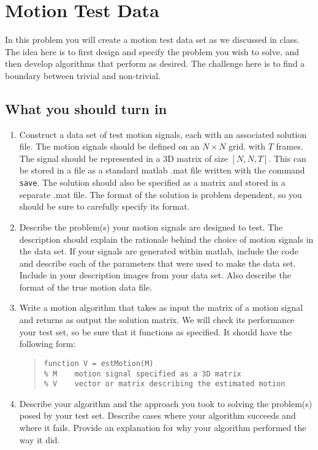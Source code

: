 \documentclass[11pt]{article}
\begin{document}
\pagebreak
\section{Motion Test Data}

In this problem you will create a motion test data set as we discussed in class.  The idea here is to first design and specify the problem you wish to solve, and then develop algorithms that perform as desired.  The challenge here is to find a boundary between trivial and non-trivial.

\subsection*{What you should turn in}

\begin{enumerate}

\item Construct a data set of test motion signals, each with an associated solution file.  The motion signals should be defined on an $N \times N$ grid. with $T$ frames.  The signal should be represented in a 3D matrix of size $[N, N, T]$.  This can be stored in a file as a standard matlab .mat file written with the command \texttt{save}.   The solution should also be specified as a matrix and stored in a separate .mat file.  The format of the solution is problem dependent, so you should be sure to carefully specify its format.

\item Describe the problem(s) your motion signals are designed to test.  The description should explain the rationale behind the choice of motion signals in the data set.  If your signals are generated within matlab, include the code and describe each of the parameters that were used to make the data set.  Include in your description images from your data set.  Also describe the format of the true motion data file.

\item Write a motion algorithm that takes as input the matrix of a motion signal and returns as output the solution matrix.  We will check its performance your test set, so be sure that it functions as specified.  It should have the following form:
\begin{quote}
\small
\begin{verbatim}
function V = estMotion(M)
% M    motion signal specified as a 3D matrix
% V    vector or matrix describing the estimated motion

\end{verbatim}
\end{quote}

\item Describe your algorithm and the approach you took to solving the problem(s) posed by your test set.  Describe cases where your algorithm succeeds and where it fails.  Provide an explanation for why your algorithm performed the way it did.

\end{enumerate}
\end{document}
